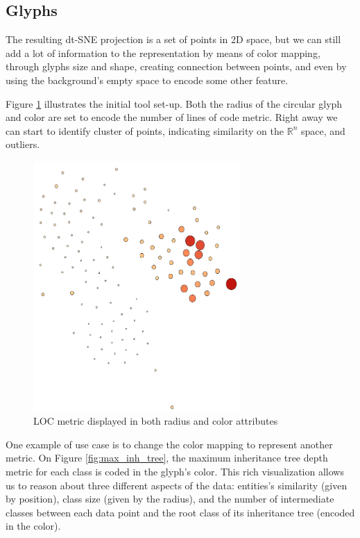\subsection{Glyphs} \label{sec:glyphs}
The resulting dt-SNE projection is a set of points in 2D space, but we can still add a lot of information to the representation by means of color mapping, through glyphs size and shape, creating connection between points, and even by using the background's empty space to encode some other feature.

Figure \ref{fig:count_line} illustrates the initial tool set-up. Both the radius of the circular glyph and color are set to encode the number of lines of code metric. Right away we can start to identify cluster of points, indicating similarity on the $\mathbb{R}^{n}$ space, and outliers.

\begin{figure}[H]
  \centering
  \includegraphics[width=0.7\textwidth]{figures/count_line.png}
  \caption{LOC metric displayed in both radius and color attributes}
  \label{fig:count_line}
\end{figure}

One example of use case is to change the color mapping to represent another metric. On Figure \ref{fig:max_inh_tree}, the maximum inheritance tree depth metric for each class is coded in the glyph's color. This rich visualization allows us to reason about three different aspects of the data: entities's similarity (given by position), class size (given by the radius), and the number of intermediate classes between each data point and the root class of its inheritance tree (encoded in the color).

